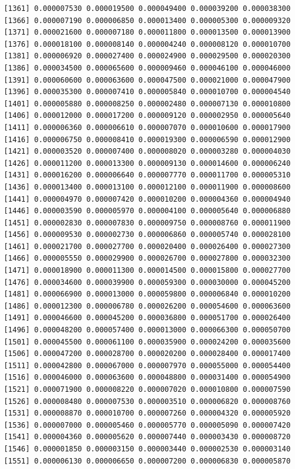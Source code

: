 \documentclass[]{article}
\begin{document}
\begin{verbatim}
 [1361] 0.000007530 0.000019500 0.000049400 0.000039200 0.000038300
 [1366] 0.000007190 0.000006850 0.000013400 0.000005300 0.000009320
 [1371] 0.000021600 0.000007180 0.000011800 0.000013500 0.000013900
 [1376] 0.000018100 0.000008140 0.000004240 0.000008120 0.000010700
 [1381] 0.000006920 0.000027400 0.000024900 0.000029500 0.000020300
 [1386] 0.000034500 0.000065600 0.000009460 0.000046100 0.000046000
 [1391] 0.000060600 0.000063600 0.000047500 0.000021000 0.000047900
 [1396] 0.000035300 0.000007410 0.000005840 0.000010700 0.000004540
 [1401] 0.000005880 0.000008250 0.000002480 0.000007130 0.000010800
 [1406] 0.000012000 0.000017200 0.000009120 0.000002950 0.000005640
 [1411] 0.000006360 0.000006610 0.000007070 0.000010600 0.000017900
 [1416] 0.000006750 0.000008410 0.000019300 0.000006590 0.000012900
 [1421] 0.000003520 0.000007400 0.000008020 0.000003280 0.000004030
 [1426] 0.000011200 0.000013300 0.000009130 0.000014600 0.000006240
 [1431] 0.000016200 0.000006640 0.000007770 0.000011700 0.000005310
 [1436] 0.000013400 0.000013100 0.000012100 0.000011900 0.000008600
 [1441] 0.000004970 0.000007420 0.000010200 0.000004360 0.000004940
 [1446] 0.000003590 0.000005970 0.000004100 0.000005640 0.000006880
 [1451] 0.000002830 0.000007830 0.000009750 0.000008760 0.000011900
 [1456] 0.000009530 0.000002730 0.000006860 0.000005740 0.000028100
 [1461] 0.000021700 0.000027700 0.000020400 0.000026400 0.000027300
 [1466] 0.000005550 0.000029900 0.000026700 0.000027800 0.000032300
 [1471] 0.000018900 0.000011300 0.000014500 0.000015800 0.000027700
 [1476] 0.000034600 0.000039900 0.000059300 0.000030000 0.000045200
 [1481] 0.000066900 0.000013000 0.000059800 0.000006840 0.000010200
 [1486] 0.000012300 0.000006780 0.000026200 0.000054600 0.000063600
 [1491] 0.000046600 0.000045200 0.000036800 0.000051700 0.000026400
 [1496] 0.000048200 0.000057400 0.000013000 0.000066300 0.000050700
 [1501] 0.000045500 0.000061100 0.000035900 0.000024200 0.000035600
 [1506] 0.000047200 0.000028700 0.000020200 0.000028400 0.000017400
 [1511] 0.000042800 0.000067000 0.000007970 0.000055000 0.000054400
 [1516] 0.000046000 0.000063600 0.000048800 0.000031400 0.000054900
 [1521] 0.000071900 0.000008220 0.000007020 0.000010800 0.000007590
 [1526] 0.000008480 0.000007530 0.000003510 0.000006820 0.000008760
 [1531] 0.000008870 0.000010700 0.000007260 0.000004320 0.000005920
 [1536] 0.000007000 0.000005460 0.000005770 0.000005090 0.000007420
 [1541] 0.000004360 0.000005620 0.000007440 0.000003430 0.000008720
 [1546] 0.000001850 0.000003150 0.000003440 0.000002530 0.000003140
 [1551] 0.000006130 0.000006650 0.000007200 0.000006830 0.000005870

\end{verbatim}
\end{document}
